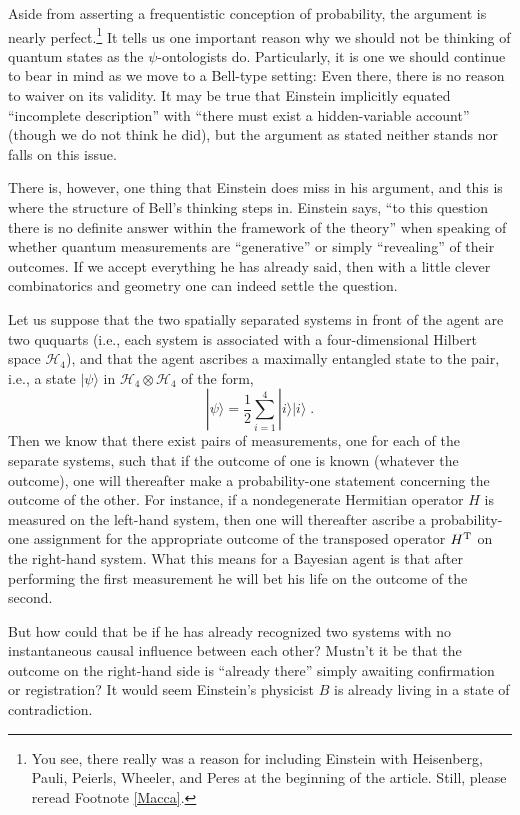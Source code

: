 Aside from asserting a frequentistic conception of probability, the argument is nearly perfect.\footnote{You see, there really was a reason for including Einstein with Heisenberg, Pauli, Peierls, Wheeler, and Peres at the beginning of the article.  Still, please reread Footnote \ref{Macca}.}  It tells us one important reason why we should not be thinking of quantum states as the $\psi$-ontologists do.  Particularly, it is one we should continue to bear in mind as we move to a Bell-type setting:  Even there, there is no reason to waiver on its validity.  It may be true that Einstein implicitly equated ``incomplete description'' with ``there must exist a hidden-variable account'' (though we do not think he did), but the argument as stated neither stands nor falls on this issue.

There is, however, one thing that Einstein does miss in his argument, and this is where the structure of Bell's thinking steps in.  Einstein says, ``to this question there is no definite answer within the framework of the theory'' when speaking of whether quantum measurements are ``generative'' or simply ``revealing'' of their outcomes.  If we accept everything he has already said, then with a little clever combinatorics and geometry one can indeed settle the question.

Let us suppose that the two spatially separated systems in front of the agent are two ququarts (i.e., each system is associated with a four-dimensional Hilbert space ${\mathcal H}_4$), and that the agent ascribes a maximally entangled state to the pair, i.e., a state $|\psi\rangle$ in ${\mathcal H}_4\otimes{\mathcal H}_4$ of the form,
\begin{equation}
|\psi\rangle=\frac{1}{2}\sum_{i=1}^4|i\rangle|i\rangle\;.
\end{equation}
Then we know that there exist pairs of measurements, one for each of the separate systems, such that if the outcome of one is known (whatever the outcome), one will thereafter make a probability-one statement concerning the outcome of the other.  For instance, if a nondegenerate Hermitian operator $H$ is measured on the left-hand system, then one will thereafter ascribe a probability-one assignment for the appropriate outcome of the transposed operator $H^{\rm\small T}$ on the right-hand system.  What this means for a Bayesian agent is that after performing the first measurement he will bet his life on the outcome of the second.

But how could that be if he has already recognized two systems with no instantaneous causal influence between each other?  Mustn't it be that the outcome on the right-hand side is ``already there'' simply awaiting confirmation or registration?  It would seem Einstein's physicist $B$ is already living in a state of contradiction.

